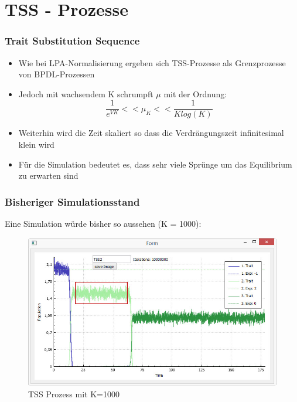 \documentclass{beamer}
\begin{document}
\section{TSS - Prozesse}
	\begin{frame}
		\frametitle{Trait Substitution Sequence}
		\begin{itemize}
			\item Wie bei LPA-Normalisierung ergeben sich TSS-Prozesse als Grenzprozesse von BPDL-Prozessen
			\pause
			\item Jedoch mit wachsendem K schrumpft $ \mu $ mit der Ordnung:
			\[ \frac{1}{e^{VK}} << \mu_K << \frac{1}{K log(K)} \]
			\pause
			\item Weiterhin wird die Zeit skaliert so dass die Verdrängungszeit infinitesimal klein wird
			\pause
			\item Für die Simulation bedeutet es, dass sehr viele Sprünge um das Equilibrium zu erwarten sind
		\end{itemize}
	\end{frame}
	\begin{frame}
		\frametitle{Bisheriger Simulationsstand}
		Eine Simulation würde bisher so aussehen (K = 1000):
		\pause
		\begin{figure}[H]
			\centering
			\includegraphics[width=0.8\linewidth]{./TSS_BPDLSimulation}
			\caption[TSS Prozess]{TSS Prozess mit K=1000}
			\label{fig:TSS_BPDLSimulation}
		\end{figure}

	\end{frame}
	
\end{document}
